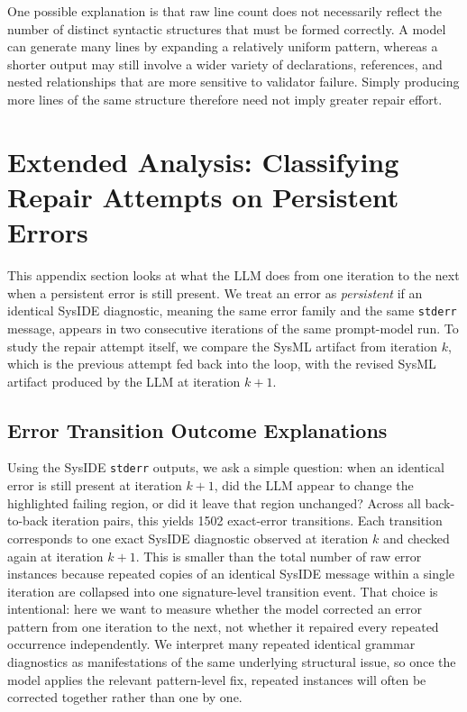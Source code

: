 One possible explanation is that raw line count does not necessarily reflect the number of distinct syntactic structures that must be formed correctly. A model can generate many lines by expanding a relatively uniform pattern, whereas a shorter output may still involve a wider variety of declarations, references, and nested relationships that are more sensitive to validator failure. Simply producing more lines of the same structure therefore need not imply greater repair effort.

\section{Extended Analysis: Classifying Repair Attempts on Persistent Errors}
This appendix section looks at what the LLM does from one iteration to the next when a persistent error is still present. We treat an error as \emph{persistent} if an identical SysIDE diagnostic, meaning the same error family and the same \texttt{stderr} message, appears in two consecutive iterations of the same prompt-model run. To study the repair attempt itself, we compare the SysML artifact from iteration \(k\), which is the previous attempt fed back into the loop, with the revised SysML artifact produced by the LLM at iteration \(k+1\).

\subsection{Error Transition Outcome Explanations}
Using the SysIDE \texttt{stderr} outputs, we ask a simple question: when an identical error is still present at iteration \(k+1\), did the LLM appear to change the highlighted failing region, or did it leave that region unchanged? Across all back-to-back iteration pairs, this yields 1502 exact-error transitions. Each transition corresponds to one exact SysIDE diagnostic observed at iteration \(k\) and checked again at iteration \(k+1\). This is smaller than the total number of raw error instances because repeated copies of an identical SysIDE message within a single iteration are collapsed into one signature-level transition event. That choice is intentional: here we want to measure whether the model corrected an error pattern from one iteration to the next, not whether it repaired every repeated occurrence independently. We interpret many repeated identical grammar diagnostics as manifestations of the same underlying structural issue, so once the model applies the relevant pattern-level fix, repeated instances will often be corrected together rather than one by one.

